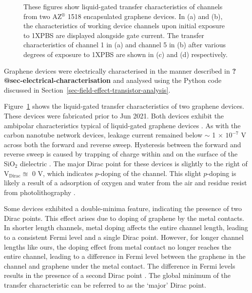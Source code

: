 \documentclass[
  a4paper,
]{scrbook}
\begin{document}
\begin{figure}
\begin{minipage}[t]{0.47\linewidth}
{{}

}

\subcaption{\label{fig-graphene-transfer-comparison-2}}
\end{minipage}%

\caption{\label{fig-pristine-graphene}These figures show liquid-gated
transfer characteristics of channels from two AZ\(^\circledR\) 1518
encapsulated graphene devices. In (a) and (b), the characteristics of
working device channels upon initial exposure to 1XPBS are displayed
alongside gate current. The transfer characteristics of channel 1 in (a)
and channel 5 in (b) after various degrees of exposure to 1XPBS are
shown in (c) and (d) respectively.}

\end{figure}

Graphene devices were electrically characterised in the manner described
in \textbf{?@sec-electrical-characterisation} and analysed using the
Python code discussed in
Section~\ref{sec-field-effect-transistor-analysis}.

Figure~\ref{fig-pristine-graphene} shows the liquid-gated transfer
characteristics of two graphene devices. These devices were fabricated
prior to Jun 2021. Both devices exhibit the ambipolar characteristics
typical of liquid-gated graphene devices
\autocite{Heller2009a,Heller2010,Xia2010,Kireev2017}. As with the carbon
nanotube network devices, leakage current remained below \(\sim\) 1
\(\times\) \(10^{-7}\) V across both the forward and reverse sweep.
Hysteresis between the forward and reverse sweep is caused by trapping
of charge within and on the surface of the SiO\(_{2}\) dielectric
\autocite{Bartolomeo2011}. The major Dirac point for these devices is
slightly to the right of V\(_{\textrm{Dirac}} \approxeq\) 0 V, which
indicates \(p\)-doping of the channel. This slight \(p\)-doping is
likely a result of a adsorption of oxygen and water from the air and
residue resist from photolithography
\autocite{Cheng2011,Shin2012,Kireev2017}.

Some devices exhibited a double-minima feature, indicating the presence
of two Dirac points. This effect arises due to doping of graphene by the
metal contacts. In shorter length channels, metal doping affects the
entire channel length, leading to a consistent Fermi level and a single
Dirac point. However, for longer channel lengths like ours, the doping
effect from metal contact no longer reaches the entire channel, leading
to a difference in Fermi level between the graphene in the channel and
graphene under the metal contact. The difference in Fermi levels results
in the presence of a second Dirac point
\autocite{Bartolomeo2011,Feng2014,Peng2018}. The global minimum of the
transfer characteristic can be referred to as the `major' Dirac point.
\end{document}
